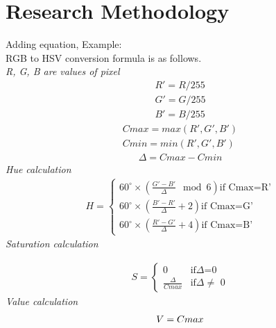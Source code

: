 \chapter{Research Methodology}

Adding equation, Example:\\
\noindent RGB to HSV conversion formula is as follows\cite{dip}.\\
\textit{R, G, B are values of pixel}
\begin{align}
R'=R/255 \nonumber \\
G'=G/255\nonumber \\
B'=B/255\nonumber
\end{align}
\begin{eqnarray}
Cmax=max(R', G', B')\nonumber \\
Cmin=min(R', G', B')\nonumber 
\end{eqnarray}
\begin{eqnarray}
\Delta=Cmax-Cmin\nonumber
\end{eqnarray}
\textit{Hue calculation}
\begin{eqnarray}
H=\begin{cases}
	60^\circ \times \left(\frac{G'-B'}{\Delta} \mod 6\right) \text{if Cmax=R'}\\
	60^\circ \times \left(\frac{B'-R'}{\Delta} + 2 \right) \text{if Cmax=G'}\\
	60^\circ \times \left(\frac{R'-G'}{\Delta} + 4 \right) \text{if Cmax=B'}
\end{cases}
\end{eqnarray}
\clearpage
\noindent \textit{Saturation calculation}

\begin{eqnarray}
S=\begin{cases}
	0 & \text{if}\Delta \text{=0} \\
	\frac{\Delta}{Cmax} & \text{if}\Delta \neq \text{ 0}
\end{cases}
\end{eqnarray}
\textit{Value calculation}
\begin{eqnarray}
\large{V=Cmax}
\end{eqnarray}

